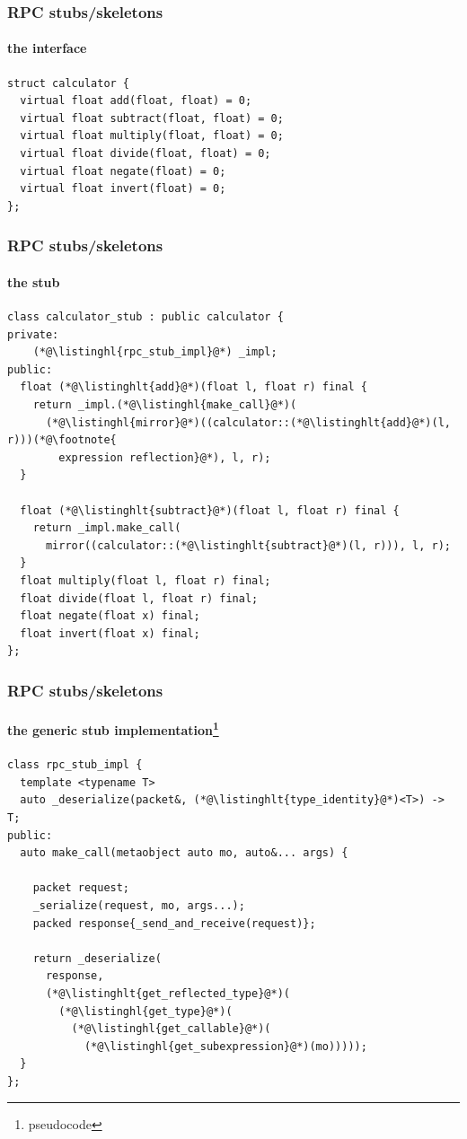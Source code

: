 \documentclass[compress,table,xcolor=table]{beamer}
\begin{document}
\begin{frame}[fragile]
  \frametitle{RPC stubs/skeletons}
  \framesubtitle{the interface}
  \begin{lstlisting}[language=c++2x,basicstyle=\normalsize\ttfamily]
struct calculator {
  virtual float add(float, float) = 0;
  virtual float subtract(float, float) = 0;
  virtual float multiply(float, float) = 0;
  virtual float divide(float, float) = 0;
  virtual float negate(float) = 0;
  virtual float invert(float) = 0;
};
  \end{lstlisting}
\end{frame}
\begin{frame}[fragile]
  \frametitle{RPC stubs/skeletons}
  \framesubtitle{the stub}
  \begin{lstlisting}[language=c++2x,basicstyle=\footnotesize\ttfamily]
class calculator_stub : public calculator {
private:
    (*@\listinghl{rpc_stub_impl}@*) _impl;
public:
  float (*@\listinghlt{add}@*)(float l, float r) final {
    return _impl.(*@\listinghl{make_call}@*)(
      (*@\listinghl{mirror}@*)((calculator::(*@\listinghlt{add}@*)(l, r)))(*@\footnote{
        expression reflection}@*), l, r);
  }

  float (*@\listinghlt{subtract}@*)(float l, float r) final {
    return _impl.make_call(
      mirror((calculator::(*@\listinghlt{subtract}@*)(l, r))), l, r);
  }
  float multiply(float l, float r) final;
  float divide(float l, float r) final;
  float negate(float x) final;
  float invert(float x) final;
};
  \end{lstlisting}
\end{frame}
\begin{frame}[fragile]
  \frametitle{RPC stubs/skeletons}
  \framesubtitle{the generic stub implementation\footnote{pseudocode}}
  \begin{lstlisting}[language=c++2x,basicstyle=\footnotesize\ttfamily]
class rpc_stub_impl {
  template <typename T>
  auto _deserialize(packet&, (*@\listinghlt{type_identity}@*)<T>) -> T;
public:
  auto make_call(metaobject auto mo, auto&... args) {

    packet request;
    _serialize(request, mo, args...);
    packed response{_send_and_receive(request)};

    return _deserialize(
      response,
      (*@\listinghlt{get_reflected_type}@*)(
        (*@\listinghl{get_type}@*)(
          (*@\listinghl{get_callable}@*)(
            (*@\listinghl{get_subexpression}@*)(mo)))));
  }
};
  \end{lstlisting}
\end{frame}
\end{document}

